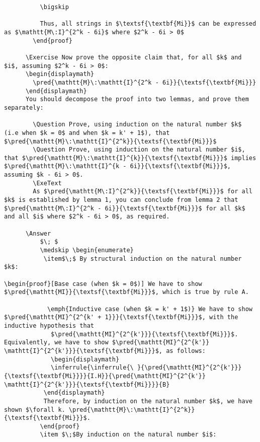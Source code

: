 \documentclass{book}
\begin{document}
\begin{verbatim}
          \bigskip
          
          Thus, all strings in $\textsf{\textbf{Mi}}$ can be expressed as $\mathtt{M\:I}^{2^k - 6i}$ where $2^k - 6i > 0$
        \end{proof}

      \Exercise Now prove the opposite claim that, for all $k$ and $i$, assuming $2^k - 6i > 0$:
      \begin{displaymath}
        \pred{\mathtt{M}\:\mathtt{I}^{2^k - 6i}}{\textsf{\textbf{Mi}}}
      \end{displaymath}
      You should decompose the proof into two lemmas, and prove them separately:
      
        \Question Prove, using induction on the natural number $k$ (i.e when $k = 0$ and when $k = k' + 1$), that $\pred{\mathtt{M}\:\mathtt{I}^{2^k}}{\textsf{\textbf{Mi}}}$
        \Question Prove, using induction on the natural number $i$, that $\pred{\mathtt{M}\:\mathtt{I}^{k}}{\textsf{\textbf{Mi}}}$ implies $\pred{\mathtt{M}\:\mathtt{I}^{k - 6i}}{\textsf{\textbf{Mi}}}$, assuming $k - 6i > 0$.
        \ExeText
        As $\pred{\mathtt{M\:I}^{2^k}}{\textsf{\textbf{Mi}}}$ for all $k$ is established by lemma 1, you can conclude from lemma 2 that $\pred{\mathtt{M\:I}^{2^k - 6i}}{\textsf{\textbf{Mi}}}$ for all $k$ and all $i$ where $2^k - 6i > 0$, as required.

      \Answer 
          $\; $
          \medskip \begin{enumerate}
           \item$\;$ By structural induction on the natural number $k$:

\begin{proof}[Base case (when $k = 0$)] We have to show $\pred{\mathtt{MI}}{\textsf{\textbf{Mi}}}$, which is true by rule A.
            
            \emph{Inductive case (when $k = k' + 1$)} We have to show $\pred{\mathtt{MI}^{2^{k' + 1}}}{\textsf{\textbf{Mi}}}$, with the inductive hypothesis that
             $\pred{\mathtt{MI}^{2^{k'}}}{\textsf{\textbf{Mi}}}$. Equivalently, we have to show $\pred{\mathtt{MI}^{2^{k'}} \mathtt{I}^{2^{k'}}}{\textsf{\textbf{Mi}}}$, as follows:
             \begin{displaymath}
             \inferrule{\inferrule{\ }{\pred{\mathtt{MI}^{2^{k'}}}{\textsf{\textbf{Mi}}}}{I.H}}{\pred{\mathtt{MI}^{2^{k'}} \mathtt{I}^{2^{k'}}}{\textsf{\textbf{Mi}}}}{B}
           \end{displaymath}
           Therefore, by induction on the natural number $k$, we have shown $\forall k. \pred{\mathtt{M}\:\mathtt{I}^{2^k}}{\textsf{\textbf{Mi}}}$.
          \end{proof}
          \item $\;$By induction on the natural number $i$:


\end{verbatim}
\end{document}
